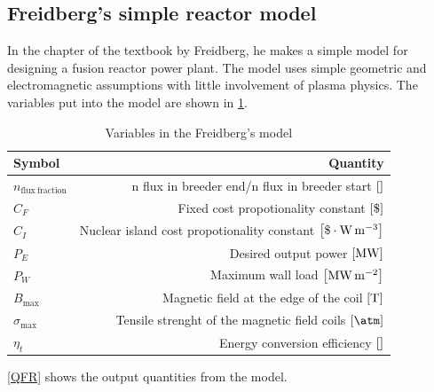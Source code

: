 \subsection{Freidberg's simple reactor model}
In the  chapter of the textbook by Freidberg\cite{freidberg_plasma_2007}, he makes a simple model for designing a fusion reactor power plant.
The model uses simple geometric and electromagnetic assumptions with little involvement of plasma physics. The variables put into the model are shown in \cref{VFR}.
\begin{table}
	\centering
	\begin{tabular}{lr}
		\toprule
		Symbol                         & Quantity                                                                                 \\
		\midrule
		\(n_\mathrm{flux \ fraction}\) & n flux in breeder end/n flux in breeder start \(\bqty{}\)                                \\
		\(C_F\)                        & Fixed cost propotionality constant \(\bqty{\$}\)                                         \\
		\(C_I\)                        & Nuclear island cost propotionality constant \(\bqty{\$\cdot\si{\watt\per\meter\cubed}}\) \\
		\(P_E\)                        & Desired output power \(\bqty{\si{\mega\watt}}\)                                          \\
		\(P_W\)                        & Maximum wall load \(\bqty{\si{\mega\watt\per\meter\squared}}\)                           \\
		\(B_{\max}\)                   & Magnetic field at the edge of the coil \(\bqty{\si{\tesla}}\)                            \\
		\(\sigma_{\max}\)              & Tensile strenght of the magnetic field coils \(\bqty{\si{\atm}}\)                        \\
		\(\eta_t\)                     & Energy conversion efficiency \(\bqty{}\)                                                 \\
		\bottomrule
	\end{tabular}
	\caption{Variables in the Freidberg's model}
	\label{VFR}
\end{table}
\cref{QFR} shows the output quantities from the model.
